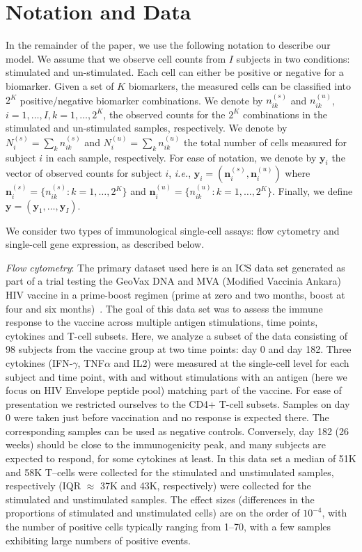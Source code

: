 \documentclass[12pt,oupdraft]{biostatistics}
\begin{document}
\section{Notation and Data}
\label{s:data}

In the remainder of the paper, we use the following notation to describe our model.  We assume that we observe cell counts from $I$ subjects in two conditions: stimulated and un-stimulated. Each cell can either be positive or negative for a biomarker. Given a set of $K$ biomarkers, the measured cells can be classified into $2^K$ positive/negative biomarker combinations. We denote by $n^{(s)}_{ik}$ and $n^{(u)}_{ik}$, $i=1,\dots,I,k=1,\dots, 2^K$, the observed counts for the $2^K$ combinations in the stimulated and un-stimulated samples, respectively. We denote by $N^{(s)}_{i}=\sum_k n^{(s)}_{ik}$ and $N^{(u)}_{i}=\sum_k n^{(u)}_{ik}$ the total number of cells measured for subject $i$ in each sample, respectively. For ease of notation, we denote by $\mathbf{y}_i$ the vector of observed counts for subject $i$, \textit{i.e.}, $\mathbf{y}_{i}=(\mathbf{n}^{(s)}_{i}, \mathbf{n}^{(u)}_{i})$ where $\mathbf{n}^{(s)}_{i}=\{n^{(s)}_{ik}: k=1,\dots,2^K\}$ and $\mathbf{n}^{(u)}_{i}=\{n^{(u)}_{ik}: k=1,\dots,2^K\}$. Finally, we define $\mathbf{y}=(\mathbf{y}_1,\dots,\mathbf{y}_I)$.

We consider two types of immunological single-cell assays: flow cytometry and single-cell gene expression, as described below.

\textit{Flow cytometry}:
The primary dataset used here is an ICS data set generated as part of a  trial testing the GeoVax DNA and MVA (Modified Vaccinia Ankara) HIV vaccine in a prime-boost regimen (prime at zero and two months, boost at four and six months)~\citep{Goepfert:2011ci}.
The goal of this data set was to assess the immune response to the vaccine across multiple antigen stimulations, time points, cytokines and T-cell subsets.
Here, we analyze a subset of the data consisting of 98 subjects from the vaccine group at two time points: day 0 and day 182.
Three cytokines (IFN-$\gamma$, TNF$\alpha$ and IL2) were measured at the single-cell level for each subject and time point, with and without stimulations with an antigen (here we focus on HIV Envelope peptide pool) matching part of the vaccine. For ease of presentation we restricted ourselves to the CD4+ T-cell subsets. Samples on day 0 were taken just before vaccination and no response is expected there. The corresponding samples can be used as negative controls. Conversely, day 182 (26 weeks) should be close to the immunogenicity peak, and many subjects are expected to respond, for some cytokines at least. In this data set a median of 51K and 58K T--cells were collected for the stimulated and unstimulated samples, respectively (IQR $\approx$ 37K and 43K, respectively) were collected for the stimulated and unstimulated samples. The effect sizes (differences in the proportions of stimulated and unstimulated cells) are on the order of $10^{-4}$, with the number of positive cells typically ranging from 1--70, with a few samples exhibiting large numbers of positive events.
\end{document}

